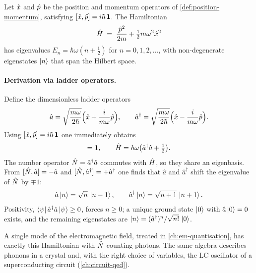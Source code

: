 \begin{statement}
\label{stmt:qho-spectrum}
Let $\hat{x}$ and $\hat{p}$ be the position and momentum operators of
\cref{def:position-momentum}, satisfying
$[\hat{x},\hat{p}]=i\hbar\,\mathbf{1}$. The Hamiltonian
\begin{equation}
\hat{H} \;=\; \frac{\hat{p}^2}{2m} + \tfrac12 m\omega^2 \hat{x}^2
\end{equation}
has eigenvalues $E_n=\hbar\omega(n+\tfrac12)$ for $n=0,1,2,\ldots$,
with non-degenerate eigenstates $\ket{n}$ that span the Hilbert
space.
\end{statement}

\paragraph{Derivation via ladder operators.}
Define the dimensionless ladder operators
\begin{equation}
\label{eq:ladder-def}
\hat{a}   = \sqrt{\frac{m\omega}{2\hbar}}\Bigl(\hat{x}+\frac{i}{m\omega}\hat{p}\Bigr),
\qquad
\hat{a}^\dagger = \sqrt{\frac{m\omega}{2\hbar}}\Bigl(\hat{x}-\frac{i}{m\omega}\hat{p}\Bigr).
\end{equation}
Using $[\hat{x},\hat{p}]=i\hbar\,\mathbf{1}$ one immediately obtains
\begin{equation}
[\hat{a},\hat{a}^\dagger] = \id,\qquad
\op{H} = \hbar\omega\bigl(\hat{a}^\dagger \hat{a} + \tfrac12\bigr).
\end{equation}
The number operator $\hat{N}=\hat{a}^\dagger\hat{a}$ commutes with $\hat{H}$, so
they share an eigenbasis. From $[\hat{N},\hat{a}]=-\hat{a}$ and
$[\hat{N},\hat{a}^\dagger]=+\hat{a}^\dagger$
one finds that $\hat{a}$ and $\hat{a}^\dagger$ shift the eigenvalue of
$\hat{N}$ by $\mp 1$:
\begin{equation}
\label{eq:ladder-action}
\hat{a}\ket{n} = \sqrt{n}\,\ket{n-1},
\qquad
\hat{a}^\dagger\ket{n} = \sqrt{n+1}\,\ket{n+1}.
\end{equation}
Positivity, $\bra{\psi}\hat{a}^\dagger \hat{a}\ket{\psi}\geq0$, forces $n\geq0$;
a unique ground state $\ket{0}$ with $\hat{a}\ket{0}=0$ exists, and the
remaining eigenstates are
$\ket{n}=(\hat{a}^\dagger)^n/\sqrt{n!}\,\ket{0}$.

\begin{example}
A single mode of the electromagnetic field, treated in
\cref{ch:em-quantisation}, has exactly this Hamiltonian with
$\hat{N}$ counting photons. The same algebra describes phonons in a
crystal and, with the right choice of variables, the LC oscillator
of a superconducting circuit (\cref{ch:circuit-qed}).
\end{example}

